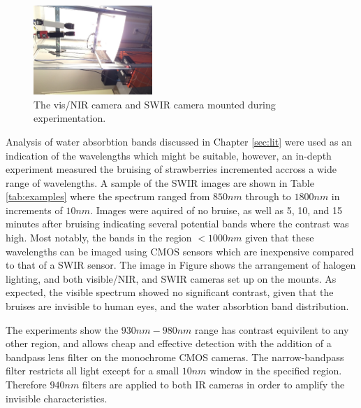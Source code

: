 \documentclass[fleqn,twoside]{article}
\begin{document}
\begin{figure}
	\begin{center}
		\includegraphics[width=0.4\textwidth,angle=270]{HSI.jpg}
	\end{center}
	\caption{The vis/NIR camera and SWIR camera mounted during experimentation.}
	\label{fig:HSI}
\end{figure} 

Analysis of water absorbtion bands discussed in Chapter \ref{sec:lit} were used as an indication of the wavelengths which might be suitable, however, an in-depth experiment measured the bruising of strawberries incremented accross a wide range of wavelengths. A sample of the SWIR images are shown in Table \ref{tab:examples} where the spectrum ranged from $850nm$ through to $1800nm$ in increments of $10nm$. Images were aquired of no bruise, as well as 5, 10, and 15 minutes after bruising indicating several potential bands where the contrast was high. Most notably, the bands in the region $<1000nm$ given that these wavelengths can be imaged using CMOS sensors which are inexpensive compared to that of a SWIR sensor. The image in Figure shows the arrangement of halogen lighting, and both visible/NIR, and SWIR cameras set up on the mounts. As expected, the visible spectrum showed no significant contrast, given that the bruises are invisible to human eyes, and the water absorbtion band distribution.

The experiments show the $930nm-980nm$ range has contrast equivilent to any other region, and allows cheap and effective detection with the addition of a bandpass lens filter on the monochrome CMOS cameras. The narrow-bandpass filter restricts all light except for a small $10nm$ window in the specified region. Therefore $940nm$ filters are applied to both IR cameras in order to amplify the invisible characteristics. 
\end{document}
